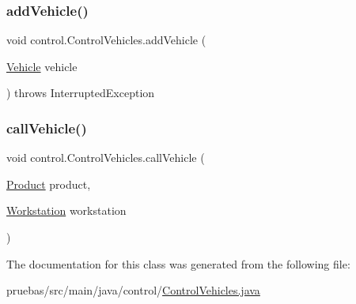 \subsubsection{\texorpdfstring{add\+Vehicle()}{addVehicle()}}
{\footnotesize\ttfamily void control.\+Control\+Vehicles.\+add\+Vehicle (\begin{DoxyParamCaption}\item[{\mbox{\hyperlink{classclases_1_1_vehicle}{Vehicle}}}]{vehicle }\end{DoxyParamCaption}) throws Interrupted\+Exception}

\mbox{\label{classcontrol_1_1_control_vehicles_ad7d1c177cdb8f933c3cb80adb7c56672}} 
\subsubsection{\texorpdfstring{call\+Vehicle()}{callVehicle()}}
{\footnotesize\ttfamily void control.\+Control\+Vehicles.\+call\+Vehicle (\begin{DoxyParamCaption}\item[{\mbox{\hyperlink{classclases_1_1_product}{Product}}}]{product,  }\item[{\mbox{\hyperlink{classclases_1_1_workstation}{Workstation}}}]{workstation }\end{DoxyParamCaption})}



The documentation for this class was generated from the following file\+:\begin{DoxyCompactItemize}
\item 
pruebas/src/main/java/control/\mbox{\hyperlink{_control_vehicles_8java}{Control\+Vehicles.\+java}}\end{DoxyCompactItemize}
